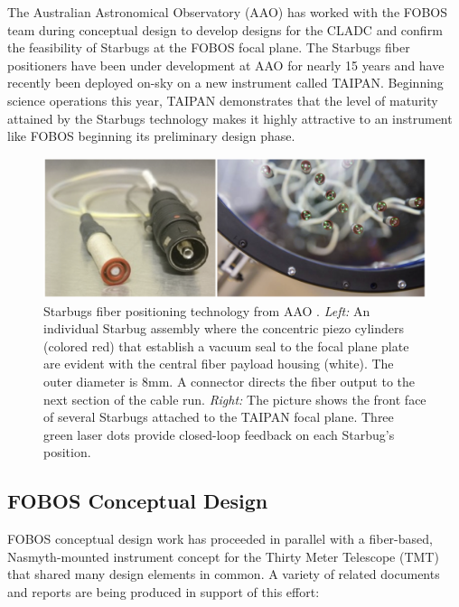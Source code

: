 \documentclass[oneside,11pt]{amsart}
\begin{document}
The Australian Astronomical Observatory (AAO) has worked with the FOBOS
team during conceptual design to develop designs for the CLADC and
confirm the feasibility of Starbugs at the FOBOS focal plane.  The
Starbugs fiber positioners have been under development at AAO for nearly
15 years \citep[see][]{staszak16} and have recently been deployed on-sky
on a new instrument called TAIPAN.  Beginning science operations this
year, TAIPAN demonstrates that the level of maturity attained by the
Starbugs technology makes it highly attractive to an instrument like
FOBOS beginning its preliminary design phase.

\begin{figure}[h!]
%
\vskip -0.1in
%
\includegraphics[width=\textwidth]{figs/starbugs.png}
%
\caption{\small Starbugs fiber positioning technology from AAO
\citep[from][]{staszak16}.  {\it Left:} An individual Starbug assembly
where the concentric piezo cylinders (colored red) that establish a
vacuum seal to the focal plane plate are evident with the central fiber
payload housing (white).  The outer diameter is 8mm.  A connector
directs the fiber output to the next section of the cable run. {\it
Right:} The picture shows the front face of several Starbugs attached to
the TAIPAN focal plane.  Three green laser dots provide closed-loop
feedback on each Starbug's position.}
%
\label{fig:starbugs}
%
\end{figure}


\subsection*{FOBOS Conceptual Design}

FOBOS conceptual design work has proceeded in parallel with a
fiber-based, Nasmyth-mounted instrument concept for the Thirty Meter
Telescope (TMT) that shared many design elements in common.  A variety
of related documents and reports are being produced in support of this
effort:
\end{document}
